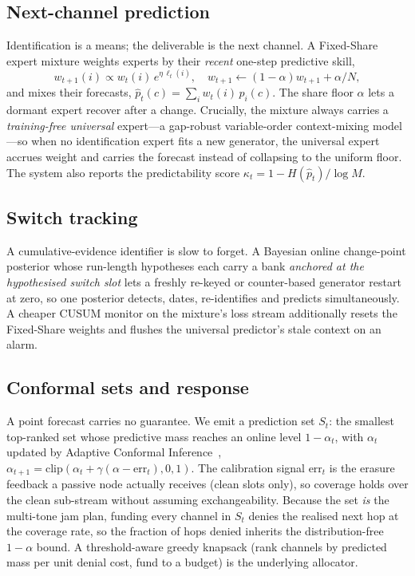 \documentclass[conference]{IEEEtran}
\begin{document}
\subsection{Next-channel prediction}
\label{sec:predict}
Identification is a means; the deliverable is the next channel. A Fixed-Share
expert mixture weights experts by their \emph{recent} one-step predictive skill,
\begin{equation}
w_{t+1}(i)\propto w_t(i)\,e^{\eta\,\ell_t(i)},\quad
w_{t+1}\leftarrow(1-\alpha)w_{t+1}+\alpha/N,
\end{equation}
and mixes their forecasts, $\hat p_t(c)=\sum_i w_t(i)\,p_i(c)$. The share floor
$\alpha$ lets a dormant expert recover after a change. Crucially, the mixture
always carries a \emph{training-free universal} expert---a gap-robust
variable-order context-mixing model---so when no identification expert fits a
new generator, the universal expert accrues weight and carries the forecast
instead of collapsing to the uniform floor. The system also reports the
predictability score $\kappa_t=1-H(\hat p_t)/\log M$.

\subsection{Switch tracking}
\label{sec:switch}
A cumulative-evidence identifier is slow to forget. A Bayesian online
change-point posterior whose run-length hypotheses each carry a bank
\emph{anchored at the hypothesised switch slot} lets a freshly re-keyed or
counter-based generator restart at zero, so one posterior detects, dates,
re-identifies and predicts simultaneously. A cheaper CUSUM monitor on the
mixture's loss stream additionally resets the Fixed-Share weights and flushes
the universal predictor's stale context on an alarm.

\subsection{Conformal sets and response}
\label{sec:conformal}
A point forecast carries no guarantee. We emit a prediction set $S_t$: the
smallest top-ranked set whose predictive mass reaches an online level
$1-\alpha_t$, with $\alpha_t$ updated by Adaptive Conformal
Inference~\cite{gibbs2021},
$\alpha_{t+1}=\mathrm{clip}(\alpha_t+\gamma(\alpha-\mathrm{err}_t),0,1)$. The
calibration signal $\mathrm{err}_t$ is the erasure feedback a passive node
actually receives (clean slots only), so coverage holds over the clean
sub-stream without assuming exchangeability. Because the set \emph{is} the
multi-tone jam plan, funding every channel in $S_t$ denies the realised next
hop at the coverage rate, so the fraction of hops denied inherits the
distribution-free $1-\alpha$ bound. A threshold-aware greedy knapsack
(rank channels by predicted mass per unit denial cost, fund to a budget) is the
underlying allocator.
\end{document}
